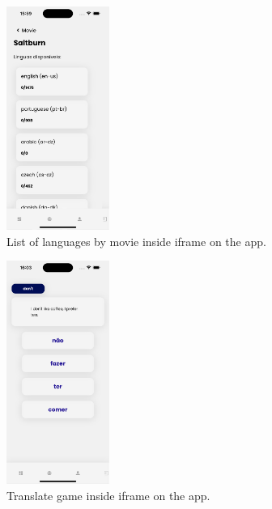 \documentclass[12pt]{article}
\begin{document}
  \begin{figure}[!h]
    \centering
    \caption{
     List of languages by movie inside iframe on the app.
    }
    \label{fig:app5}
    \includegraphics[width=0.3\textwidth]{assets/18.png}
  \end{figure}

  \begin{figure}[!h]
    \centering
    \caption{
     Translate game inside iframe on the app.
    }
    \label{fig:app6}
    \includegraphics[width=0.3\textwidth]{assets/19.png}
  \end{figure}
\end{document}
